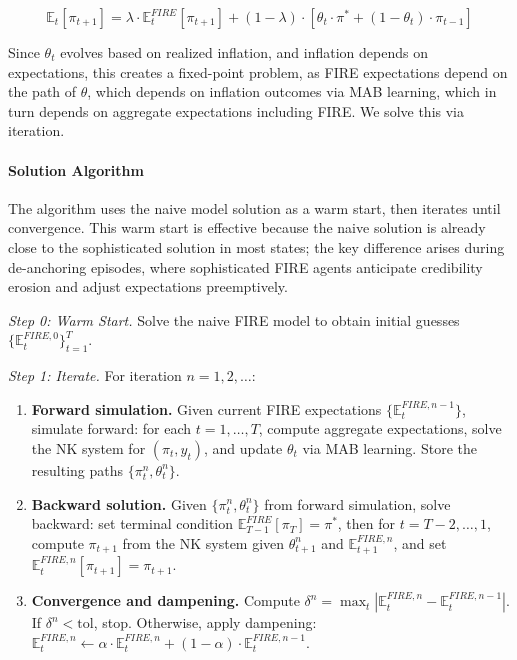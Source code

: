 \documentclass[10pt]{article}
\begin{document}
\begin{equation}
\mathbb{E}_t[\pi_{t+1}] = \lambda \cdot \mathbb{E}^{FIRE}_t[\pi_{t+1}] + (1-\lambda) \cdot \left[\theta_t \cdot \pi^* + (1-\theta_t) \cdot \pi_{t-1}\right]
\end{equation}

Since $\theta_t$ evolves based on realized inflation, and inflation depends on expectations, this creates a fixed-point problem, as FIRE expectations depend on the path of $\theta$, which depends on inflation outcomes via MAB learning, which in turn depends on aggregate expectations including FIRE. We solve this via iteration.

\paragraph{Solution Algorithm} The algorithm uses the naive model solution as a warm start, then iterates until convergence. This warm start is effective because the naive solution is already close to the sophisticated solution in most states; the key difference arises during de-anchoring episodes, where sophisticated FIRE agents anticipate credibility erosion and adjust expectations preemptively.

\textit{Step 0: Warm Start.} Solve the naive FIRE model to obtain initial guesses $\{\mathbb{E}^{FIRE,0}_t\}_{t=1}^T$.

\textit{Step 1: Iterate.} For iteration $n = 1, 2, \ldots$:

\begin{enumerate}
\item[(a)] \textbf{Forward simulation.} Given current FIRE expectations $\{\mathbb{E}^{FIRE,n-1}_t\}$, simulate forward: for each $t = 1, \ldots, T$, compute aggregate expectations, solve the NK system for $(\pi_t, y_t)$, and update $\theta_t$ via MAB learning. Store the resulting paths $\{\pi^n_t, \theta^n_t\}$.
\item[(b)] \textbf{Backward solution.} Given $\{\pi^n_t, \theta^n_t\}$ from forward simulation, solve backward: set terminal condition $\mathbb{E}^{FIRE}_{T-1}[\pi_T] = \pi^*$, then for $t = T-2, \ldots, 1$, compute $\pi_{t+1}$ from the NK system given $\theta^n_{t+1}$ and $\mathbb{E}^{FIRE,n}_{t+1}$, and set $\mathbb{E}^{FIRE,n}_t[\pi_{t+1}] = \pi_{t+1}$.
\item[(c)] \textbf{Convergence and dampening.} Compute $\delta^n = \max_t |\mathbb{E}^{FIRE,n}_t - \mathbb{E}^{FIRE,n-1}_t|$. If $\delta^n < \text{tol}$, stop. Otherwise, apply dampening: $\mathbb{E}^{FIRE,n}_t \leftarrow \alpha \cdot \mathbb{E}^{FIRE,n}_t + (1-\alpha) \cdot \mathbb{E}^{FIRE,n-1}_t$.
\end{enumerate}
\end{document}
